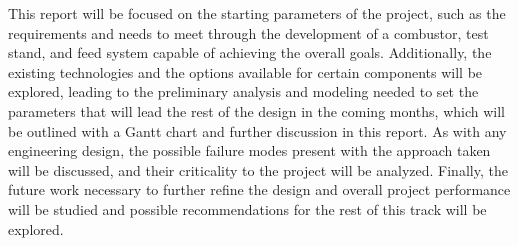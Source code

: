 This report will be focused on the starting parameters of the project, such as the requirements and needs to meet through the development of a combustor, test stand, and feed system capable of achieving the overall goals. Additionally, the existing technologies and the options available for certain components will be explored, leading to the preliminary analysis and modeling needed to set the parameters that will lead the rest of the design in the coming months, which will be outlined with a Gantt chart and further discussion in this report. As with any engineering design, the possible failure modes present with the approach taken will be discussed, and their criticality to the project will be analyzed. Finally, the future work necessary to further refine the design and overall project performance will be studied and possible recommendations for the rest of this track will be explored.

\newpage